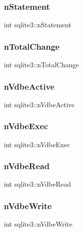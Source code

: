 \mbox{\label{structsqlite3_a727c6da42aa4313c715de350303c90f6}} 
\subsubsection{nStatement}
{\footnotesize\ttfamily int sqlite3\+::n\+Statement}

\mbox{\label{structsqlite3_ade95b396eda5eb5929851abb581cff3f}} 
\subsubsection{nTotalChange}
{\footnotesize\ttfamily int sqlite3\+::n\+Total\+Change}

\mbox{\label{structsqlite3_a85eb6c33dd8531067bba7c4a8844da15}} 
\subsubsection{nVdbeActive}
{\footnotesize\ttfamily int sqlite3\+::n\+Vdbe\+Active}

\mbox{\label{structsqlite3_a4f4a211154ba0cfbd43c57e25640dfff}} 
\subsubsection{nVdbeExec}
{\footnotesize\ttfamily int sqlite3\+::n\+Vdbe\+Exec}

\mbox{\label{structsqlite3_a321880eb620a917a0b509f5629612227}} 
\subsubsection{nVdbeRead}
{\footnotesize\ttfamily int sqlite3\+::n\+Vdbe\+Read}

\mbox{\label{structsqlite3_aa63da8ce693d136df02033f1bdb85171}} 
\subsubsection{nVdbeWrite}
{\footnotesize\ttfamily int sqlite3\+::n\+Vdbe\+Write}

